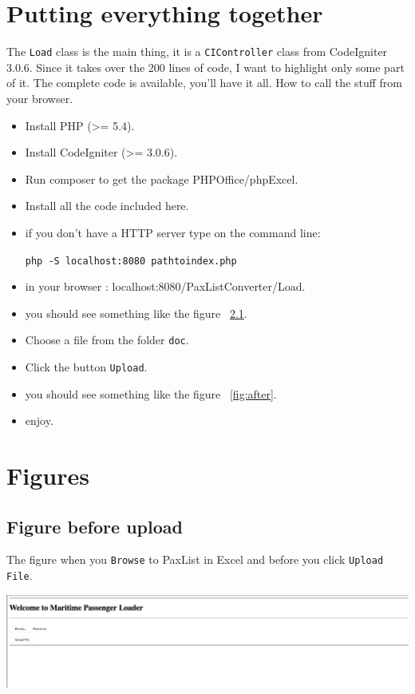 \documentclass[a4paper, 11pt]{article}
\begin{document}
\section{Putting everything together}
The \texttt{Load} class is the main thing, it is a \texttt{CI\textunderscore Controller} class from CodeIgniter 3.0.6. Since it takes over the 200 lines of code, I want to highlight only some part of it. The complete code is available, you'll have it all.
How to call the stuff from your browser.
\begin{itemize}
\item Install PHP (\textgreater= 5.4).
\item Install CodeIgniter (\textgreater = 3.0.6).
\item Run composer to get the package PHPOffice/phpExcel.
\item Install all the code included here.
\item if you don't have a HTTP server type on the command line:

 \texttt{php -S localhost:8080 path\textunderscore to\textunderscore  index.php}
\item in your browser : localhost:8080/PaxListConverter/Load.
\item you should see something like the figure ~\ref{fig:before}.
\item Choose a file from the folder \texttt{doc}.
\item Click the button \texttt{Upload}.
\item you should see something like the figure ~\ref{fig:after}.
\item enjoy.
\end{itemize}
\section{Figures}
\subsection{Figure before upload}
\label{fig:before}
The figure when you \texttt{Browse} to PaxList in Excel and before you click \texttt{Upload File}.

\includegraphics{figures/before}
\end{document}
